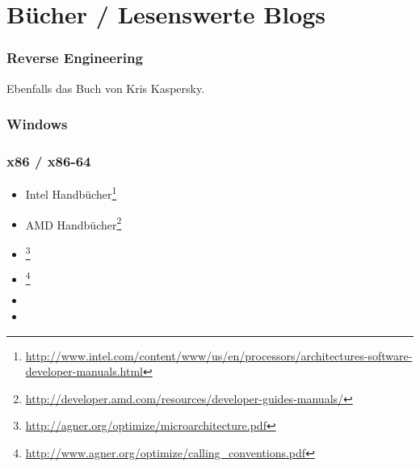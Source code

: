 \chapter{Bücher / Lesenswerte Blogs}


\subsection{Reverse Engineering}



Ebenfalls das Buch von Kris Kaspersky.

\subsection{Windows}



\subsection{\CCpp}



\subsection{x86 / x86-64}

\label{x86_manuals}
\begin{itemize}
\item Intel Handbücher\footnote{\AlsoAvailableAs \url{http://www.intel.com/content/www/us/en/processors/architectures-software-developer-manuals.html}}

\item AMD Handbücher\footnote{\AlsoAvailableAs \url{http://developer.amd.com/resources/developer-guides-manuals/}}

\item \AgnerFog{}\footnote{\AlsoAvailableAs \url{http://agner.org/optimize/microarchitecture.pdf}}

\item \AgnerFogCC{}\footnote{\AlsoAvailableAs \url{http://www.agner.org/optimize/calling_conventions.pdf}}

\item \IntelOptimization

\item \AMDOptimization
\end{itemize}

